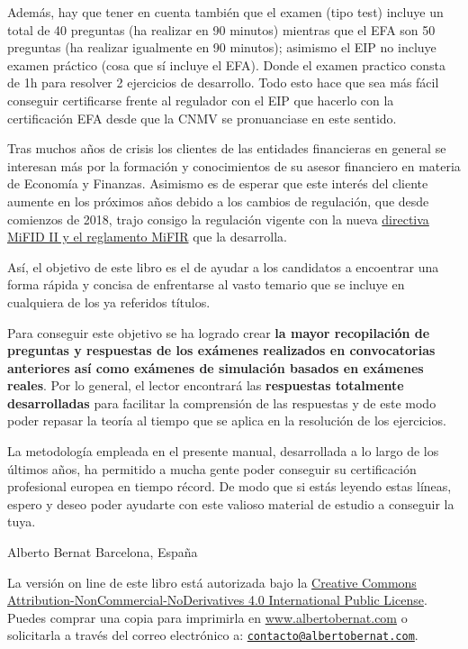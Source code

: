 \documentclass[
  letterpaper,
  DIV=11,
  numbers=noendperiod]{scrreprt}
\begin{document}
Además, hay que tener en cuenta también que el examen (tipo test)
incluye un total de 40 preguntas (ha realizar en 90 minutos) mientras
que el EFA son 50 preguntas (ha realizar igualmente en 90 minutos);
asimismo el EIP no incluye examen práctico (cosa que sí incluye el EFA).
Donde el examen practico consta de 1h para resolver 2 ejercicios de
desarrollo. Todo esto hace que sea más fácil conseguir certificarse
frente al regulador con el EIP que hacerlo con la certificación EFA
desde que la CNMV se pronuanciase en este sentido.

Tras muchos años de crisis los clientes de las entidades financieras en
general se interesan más por la formación y conocimientos de su asesor
financiero en materia de Economía y Finanzas. Asimismo es de esperar que
este interés del cliente aumente en los próximos años debido a los
cambios de regulación, que desde comienzos de 2018, trajo consigo la
regulación vigente con la nueva
\href{http://cnmv.es/portal/MIFIDII_MIFIR/MapaMiFID.aspx}{directiva
MiFID II y el reglamento MiFIR} que la desarrolla.

Así, el objetivo de este libro es el de ayudar a los candidatos a
encoentrar una forma rápida y concisa de enfrentarse al vasto temario
que se incluye en cualquiera de los ya referidos títulos.

Para conseguir este objetivo se ha logrado crear \textbf{la mayor
recopilación de preguntas y respuestas de los exámenes realizados en
convocatorias anteriores así como exámenes de simulación basados en
exámenes reales}. Por lo general, el lector encontrará las
\textbf{respuestas totalmente desarrolladas} para facilitar la
comprensión de las respuestas y de este modo poder repasar la teoría al
tiempo que se aplica en la resolución de los ejercicios.

La metodología empleada en el presente manual, desarrollada a lo largo
de los últimos años, ha permitido a mucha gente poder conseguir su
certificación profesional europea en tiempo récord. De modo que si estás
leyendo estas líneas, espero y deseo poder ayudarte con este valioso
material de estudio a conseguir la tuya.

Alberto Bernat Barcelona, España

La versión on line de este libro está autorizada bajo la
\href{https://creativecommons.org/licenses/by-nc-nd/4.0/legalcode}{Creative
Commons Attribution-NonCommercial-NoDerivatives 4.0 International Public
License}. Puedes comprar una copia para imprimirla en
\href{https://sowl.co/yUAeV}{www.albertobernat.com} o solicitarla a
través del correo electrónico a:
\href{mailto:contacto@albertobernat.com}{\nolinkurl{contacto@albertobernat.com}}.
\end{document}
